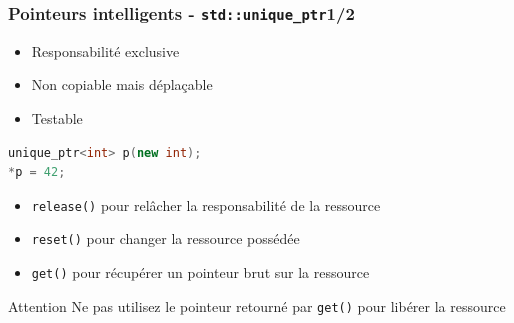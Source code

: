 \documentclass[C++.tex]{subfiles}
\begin{document}
\begin{frame}[fragile]
	\frametitle{Pointeurs intelligents - \lstinline|std::unique_ptr|\titlehfill{}1/2}
	\begin{itemize}
		\item Responsabilité exclusive
		\item Non copiable mais déplaçable
		\item Testable
	\end{itemize}

	\begin{lstlisting}[language=C++]
unique_ptr<int> p(new int);
*p = 42;\end{lstlisting}

	\begin{itemize}
		\item \lstinline|release()| pour relâcher la responsabilité de la ressource


		\item \lstinline|reset()| pour changer la ressource possédée


		\item \lstinline|get()| pour récupérer un pointeur brut sur la ressource

	\end{itemize}

	\begin{alertblock}{Attention}
		Ne pas utilisez le pointeur retourné par \lstinline|get()| pour libérer la ressource
	\end{alertblock}
\end{frame}
\end{document}
